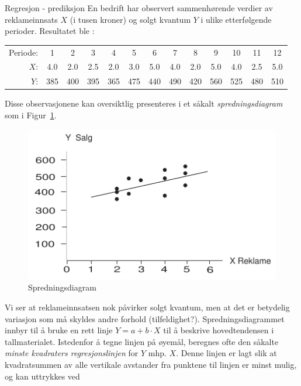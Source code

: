  \begin{eksempel}{Regresjon - prediksjon}
 En bedrift har observert sammenhørende verdier av reklameinnsats 
 $X$ (i tusen kroner) og solgt kvantum $Y$ i ulike etterfølgende perioder.
 Resultatet ble :
 \begin{center} \small \addtolength{\tabcolsep}{-0.4\tabcolsep}
  \begin{tabular}{rcccccccccccc}
  Periode: & 1&2&3&4&5&6&7&8&9&10&11&12 \\
      $X$: & 4.0&2.0&2.5&2.0&3.0&5.0&4.0&2.0&5.0&4.0&2.5&5.0 \\
      $Y$: &385&400&395&365&475&440&490&420&560&525&480&510 \\
  \end{tabular}
 \end{center}
 Disse observasjonene kan oversiktlig presenteres i et såkalt
 {\em spredningsdiagram} som i Figur~\ref{fig:spredningsdiagram}. \\
 \begin{figure}[ht]
\centering \centering
  \includegraphics[scale=0.7]{figurer/fig1_4.pdf}
  \caption {Spredningsdiagram}
	 \label{fig:spredningsdiagram}

 \end{figure}
 \end{eksempel}


 Vi ser at reklameinnsatsen nok påvirker solgt kvantum, men at
 det er betydelig variasjon som må skyldes andre forhold
 (tilfeldighet?). Spredningsdiagrammet innbyr til å bruke en
 rett linje $ Y = a + b \cdot X $ til å beskrive hovedtendensen i
 tallmaterialet. Istedenfor å tegne linjen på øyemål, beregnes
 ofte den såkalte {\em minste kvadraters regresjonslinjen} for $Y$ mhp.
 $X$. Denne linjen er lagt slik at kvadratsummen av alle
 vertikale avstander fra punktene til linjen er minst mulig, og
 kan uttrykkes ved

